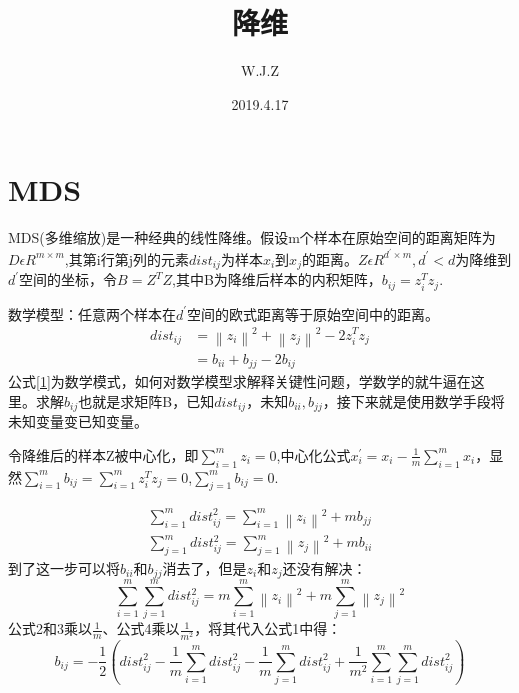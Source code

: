 \documentclass[a4paper]{article}
\title{降维}
\author{W.J.Z}
\date{2019.4.17}
\begin{document}
	\maketitle
	\section{MDS}
	MDS(多维缩放)是一种经典的线性降维。假设m个样本在原始空间的距离矩阵为$D\epsilon R^{m\times m}$,其第i行第j列的元素$dist_{ij}$为样本$x_{i}$到$x_{j}$的距离。$Z\epsilon R^{d^{'}\times m},d^{'}<d$为降维到$d^{'}$空间的坐标，令$B=Z^{T}Z$,其中B为降维后样本的内积矩阵，$b_{ij}=z_{i}^{T}z_{j}$.
	
	数学模型：任意两个样本在$d^{'}$空间的欧式距离等于原始空间中的距离。
	\begin{equation}
	\begin{split}
		dist_{ij}&=\left \| z_{i} \right \|^2 + \left \| z_{j} \right \|^2-2z_{i}^Tz_{j}\\
		&=b_{ii}+b_{jj}-2b_{ij}
	\end{split}
	\label{1}
	\end{equation}
	公式\ref{1}为数学模式，如何对数学模型求解释关键性问题，学数学的就牛逼在这里。求解$b_{ij}$也就是求矩阵B，已知$dist_{ij}$，未知$b_{ii},b_{jj}$，接下来就是使用数学手段将未知变量变已知变量。
	
	令降维后的样本Z被中心化，即$\sum_{i=1}^{m} z_{i}=0$,中心化公式$x_{i}^{'}=x_{i}-\frac{1}{m}\sum_{i=1}^{m}x_{i}$，显然$\sum_{i=1}^{m}b_{ij}=\sum_{i=1}^{m}z_{i}^{T}z_{j}=0$,$\sum_{j=1}^{m}b_{ij}=0$.
	
	\begin{eqnarray}
	\sum_{i=1}^{m}dist_{ij}^{2}=\sum_{i=1}^{m}\left \| z_{i} \right \|^2+mb_{jj}\\
	\sum_{j=1}^{m}dist_{ij}^{2}=\sum_{j=1}^{m}\left \| z_{j} \right \|^2+mb_{ii}
	\end{eqnarray}
	到了这一步可以将$b_{ii}$和$b_{jj}$消去了，但是$z_{i}$和$z_{j}$还没有解决：
	\begin{equation}
	\sum_{i=1}^{m}\sum_{j=1}^{m}dist_{ij}^{2}=m\sum_{i=1}^{m}\left \| z_{i} \right \|^2+m\sum_{j=1}^{m}\left \| z_{j} \right \|^2
	\end{equation}
	公式2和3乘以$\frac{1}{m}$、公式4乘以$\frac{1}{m^2}$，将其代入公式1中得：
	\begin{equation}
	b_{ij}=-\frac{1}{2}\left ( dist_{ij}^2-\frac{1}{m}\sum_{i=1}^{m}dist_{ij}^2-\frac{1}{m}\sum_{j=1}^{m}dist_{ij}^2+ \frac{1}{m^2}\sum_{i=1}^{m}\sum_{j=1}^{m}dist_{ij}^2\right )
	\end{equation}
	
\end{document}
